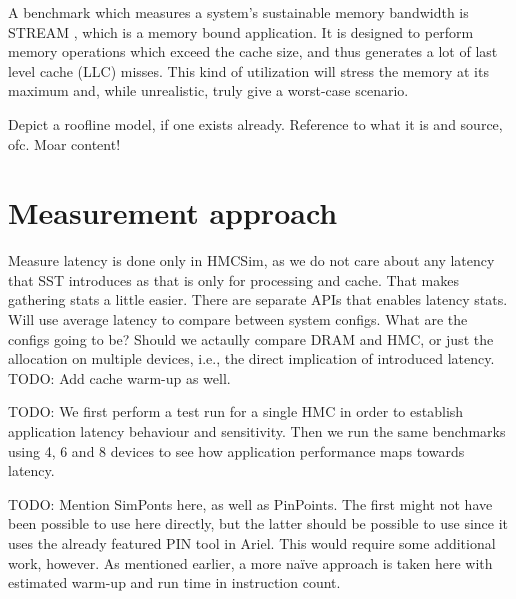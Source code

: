 A benchmark which measures a system's sustainable memory bandwidth is STREAM \cite{mccalpin1995memory}, which is a memory bound application. It is designed to perform memory operations which exceed the cache size, and thus generates a lot of last level cache (LLC) misses. This kind of utilization will stress the memory at its maximum and, while unrealistic, truly give a worst-case scenario.

Depict a roofline model, if one exists already. Reference to what it is and source, ofc. Moar content!


\section{Measurement approach}
Measure latency is done only in HMCSim, as we do not care about any latency that SST introduces as that is only for processing and cache. That makes gathering stats a little easier. There are separate APIs that enables latency stats. Will use average latency to compare between system configs. What are the configs going to be? Should we actaully compare DRAM and HMC, or just the allocation on multiple devices, i.e., the direct implication of introduced latency. TODO: Add cache warm-up as well.

TODO: We first perform a test run for a single HMC in order to establish application latency behaviour and sensitivity. Then we run the same benchmarks using 4, 6 and 8 devices to see how application performance maps towards latency. 

TODO: Mention SimPonts here, as well as PinPoints. The first might not have been possible to use here directly, but the latter should be possible to use since it uses the already featured PIN tool in Ariel. This would require some additional work, however. As mentioned earlier, a more naïve approach is taken here with estimated warm-up and run time in instruction count. 
